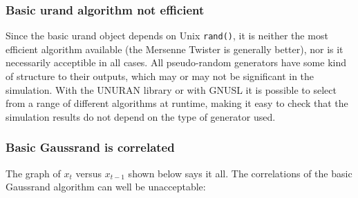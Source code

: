 \subsubsection{Basic urand algorithm not efficient}

Since the basic urand object depends on Unix \verb+rand()+, it is
neither the most efficient algorithm available (the Mersenne Twister
is generally better), nor is it necessarily acceptible in all cases.
All pseudo-random generators have some kind of structure to their
outputs, which may or may not be significant in the simulation. With
the UNURAN library or with GNUSL it is possible to select from a range
of different algorithms at runtime, making it easy to check that the
simulation results do not depend on the type of generator used.

\subsubsection{Basic Gaussrand is correlated}

The graph of $x_t$ versus $x_{t-1}$ shown below says it all. The
correlations of the basic Gaussrand algorithm can well be
unacceptable:

